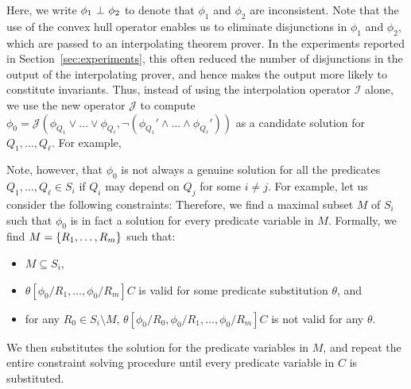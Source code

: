 Here, we write \(\phi_1 \ \bot\  \phi_2\) to denote that \(\phi_1\) and 
\(\phi_2\) are inconsistent.  Note that the use of the convex hull 
operator enables us to eliminate disjunctions in \(\phi_1\) and 
\(\phi_2\), which are passed to an interpolating theorem prover.
In the experiments reported in Section~\ref{sec:experiments}, this often 
reduced the number of disjunctions in the output of the interpolating 
prover, and hence makes the output more likely to constitute invariants.
%
Thus, instead of using the interpolation operator \(\mathcal{I}\) alone, 
we use the new operator \(\mathcal{J}\) to compute \(\phi_0 = 
\mathcal{J}(\phi_{Q_1} \lor \dots \lor \phi_{Q_{\ell}},\neg (\phi_{Q_1}' 
\land \dots \land \phi_{Q_{\ell}}'))\) as a candidate solution for 
\(Q_1,\dots,Q_{\ell}\).  For example, \todo{}

Note, however, that \(\phi_0\) is not always a genuine solution for all 
the predicates \(Q_1,\dots,Q_{\ell} \in S_i\) if \(Q_i\) may depend on 
\(Q_j\) for some \(i \neq j\).  For example, let us consider the 
following constraints: \todo{}
Therefore, we find a maximal subset \(M\) of \(S_i\) such that \(\phi_0\) 
is in fact a solution for every predicate variable in \(M\).  Formally, 
we find \(M=\{{R_1,\dots,R_m}\}\) such that:
\begin{itemize}
\item \(M \subseteq S_i\),
\item \(\theta[\phi_0/R_1,\dots,\phi_0/R_m]C\) is valid for some 
predicate substitution \(\theta\), and
\item for any \(R_0 \in S_i \setminus M\), 
\(\theta[\phi_0/R_0,\phi_0/R_1,\dots,\phi_0/R_m]C\) is not valid for any 
\(\theta\).
\end{itemize}

We then substitutes the solution for the predicate variables in \(M\), 
and repeat the entire constraint solving procedure until every predicate 
variable in \(C\) is substituted.    


%
